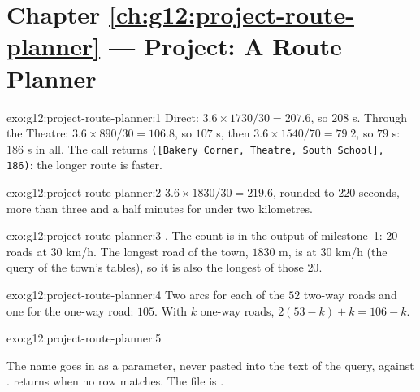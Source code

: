 \section*{Chapter \ref{ch:g12:project-route-planner} --- Project: A Route Planner}

\begin{solution}{exo:g12:project-route-planner:1}
Direct: $3.6 \times 1730 / 30 = 207.6$, so $208$ s. Through the Theatre: $3.6 \times 890 / 30 = 106.8$, so $107$ s,
then $3.6 \times 1540 / 70 = 79.2$, so $79$ s: $186$ s in all. The call returns
\texttt{([\textquotesingle{}Bakery Corner\textquotesingle{}, \textquotesingle{}Theatre\textquotesingle{}, \textquotesingle{}South School\textquotesingle{}], 186)}: the longer route is faster.
\end{solution}

\begin{solution}{exo:g12:project-route-planner:2}
$3.6 \times 1830 / 30 = 219.6$, rounded to $220$ seconds, more than three and a half minutes for under two kilometres.
\end{solution}

\begin{solution}{exo:g12:project-route-planner:3}
. The count is in the output of milestone~1: $20$ roads at $30$ km/h. The longest road of the town,
$1830$ m, is at $30$ km/h (the query of the town's tables), so it is also the longest of those $20$.
\end{solution}

\begin{solution}{exo:g12:project-route-planner:4}
Two arcs for each of the $52$ two-way roads and one for the one-way road: $105$. With $k$ one-way roads,
$2(53 - k) + k = 106 - k$.
\end{solution}

\begin{solution}{exo:g12:project-route-planner:5}
\smallskip\noindent\hspace*{2em}

\noindent\hspace*{4em}

\noindent\hspace*{12em}

\noindent\hspace*{4em}

\noindent\hspace*{6em}

\noindent\hspace*{4em}

\smallskip\noindent The name goes in as a parameter, never pasted into the text of the query, against .
 returns  when no row matches. The file is .
\end{solution}

